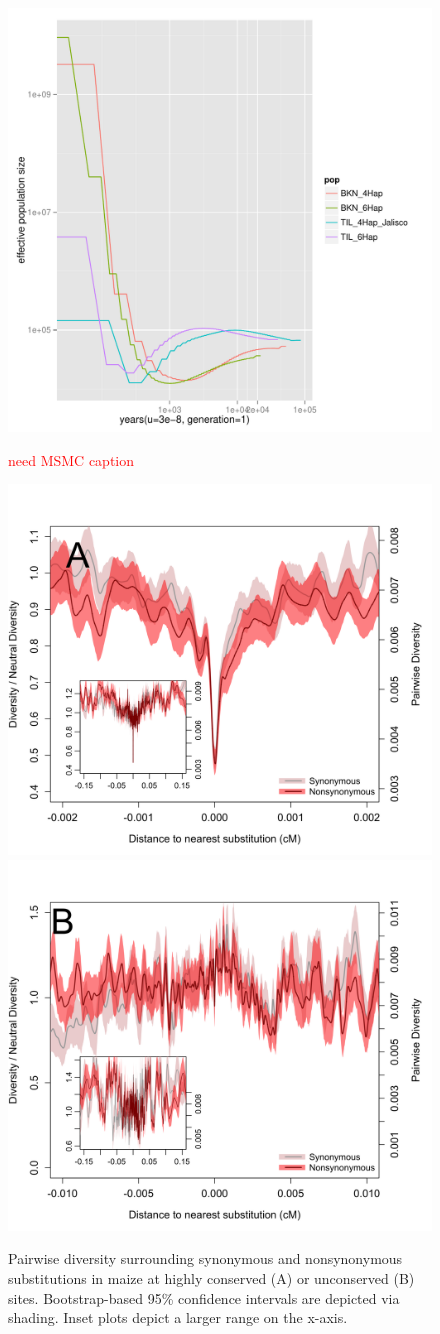 \documentclass{pnastwo}
\newcommand{\jri}[1]{\textcolor{red}{\scriptsize #1}}
\begin{document}
\begin{article}
\begin{figure}
  \DIFaddbeginFL \begin{center}
    \includegraphics[width=.85\textwidth]{FigsAndFiles/BKN.TIL.msmc.pdf} \\
    \end{center}
\caption{\jri{need MSMC caption} \label{sFig:msmc}}
\end{figure}
\clearpage


\begin{figure}
  \DIFaddendFL \includegraphics[width=.5\textwidth]{FigsAndFiles/plotDiversity_TvM_Conserved_Significance_June.png}
  \includegraphics[width=.5\textwidth]{FigsAndFiles/plotDiversity_TvM_Unconserved_Significance_June.png}
\caption{ Pairwise diversity surrounding synonymous and nonsynonymous
  substitutions in maize at highly conserved (A) or unconserved (B) sites.  Bootstrap-based 95\% confidence intervals are depicted via shading. Inset plots depict a larger range on the x-axis. \label{sFig:consUncons}}
\end{figure}
\clearpage


\end{article}
\end{document}
